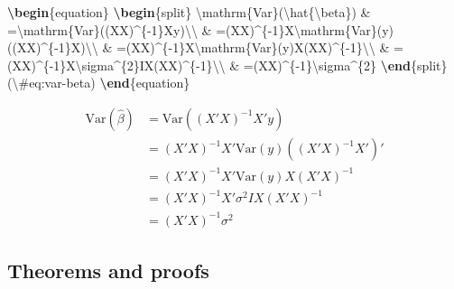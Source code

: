 \documentclass[
  12pt,
]{krantz}
\newenvironment{Shaded}{\begin{snugshade}}{\end{snugshade}}
\newcommand{\ExtensionTok}[1]{#1}
\newcommand{\KeywordTok}[1]{\textcolor[rgb]{0.13,0.29,0.53}{\textbf{#1}}}
\newcommand{\NormalTok}[1]{#1}
\newcommand{\SpecialCharTok}[1]{\textcolor[rgb]{0.00,0.00,0.00}{#1}}
\newcommand{\SpecialStringTok}[1]{\textcolor[rgb]{0.31,0.60,0.02}{#1}}
\theoremstyle{definition}
\theoremstyle{definition}
\theoremstyle{definition}
\theoremstyle{definition}
\theoremstyle{remark}
\begin{document}
\begin{Shaded}
\begin{Highlighting}[]
\KeywordTok{\textbackslash{}begin}\NormalTok{\{}\ExtensionTok{equation}\NormalTok{\}}\SpecialStringTok{ }
\KeywordTok{\textbackslash{}begin}\NormalTok{\{}\ExtensionTok{split}\NormalTok{\}}
\SpecialCharTok{\textbackslash{}mathrm}\SpecialStringTok{\{Var\}(}\SpecialCharTok{\textbackslash{}hat}\SpecialStringTok{\{}\SpecialCharTok{\textbackslash{}beta}\SpecialStringTok{\}) \& =}\SpecialCharTok{\textbackslash{}mathrm}\SpecialStringTok{\{Var\}((X\textquotesingle{}X)\^{}\{{-}1\}X\textquotesingle{}y)}\SpecialCharTok{\textbackslash{}\textbackslash{}}
\SpecialStringTok{ \& =(X\textquotesingle{}X)\^{}\{{-}1\}X\textquotesingle{}}\SpecialCharTok{\textbackslash{}mathrm}\SpecialStringTok{\{Var\}(y)((X\textquotesingle{}X)\^{}\{{-}1\}X\textquotesingle{})\textquotesingle{}}\SpecialCharTok{\textbackslash{}\textbackslash{}}
\SpecialStringTok{ \& =(X\textquotesingle{}X)\^{}\{{-}1\}X\textquotesingle{}}\SpecialCharTok{\textbackslash{}mathrm}\SpecialStringTok{\{Var\}(y)X(X\textquotesingle{}X)\^{}\{{-}1\}}\SpecialCharTok{\textbackslash{}\textbackslash{}}
\SpecialStringTok{ \& =(X\textquotesingle{}X)\^{}\{{-}1\}X\textquotesingle{}}\SpecialCharTok{\textbackslash{}sigma}\SpecialStringTok{\^{}\{2\}IX(X\textquotesingle{}X)\^{}\{{-}1\}}\SpecialCharTok{\textbackslash{}\textbackslash{}}
\SpecialStringTok{ \& =(X\textquotesingle{}X)\^{}\{{-}1\}}\SpecialCharTok{\textbackslash{}sigma}\SpecialStringTok{\^{}\{2\}}
\KeywordTok{\textbackslash{}end}\NormalTok{\{}\ExtensionTok{split}\NormalTok{\}}
\SpecialStringTok{(}\SpecialCharTok{\textbackslash{}\#}\SpecialStringTok{eq:var{-}beta)}
\KeywordTok{\textbackslash{}end}\NormalTok{\{}\ExtensionTok{equation}\NormalTok{\} }
\end{Highlighting}
\end{Shaded}

\begin{equation}
\begin{split}
\mathrm{Var}(\hat{\beta}) & =\mathrm{Var}((X'X)^{-1}X'y)\\
 & =(X'X)^{-1}X'\mathrm{Var}(y)((X'X)^{-1}X')'\\
 & =(X'X)^{-1}X'\mathrm{Var}(y)X(X'X)^{-1}\\
 & =(X'X)^{-1}X'\sigma^{2}IX(X'X)^{-1}\\
 & =(X'X)^{-1}\sigma^{2}
\end{split}
\label{eq:var-beta}
\end{equation}

\hypertarget{theorems}{%
\subsection{Theorems and proofs}\label{theorems}}
\end{document}
